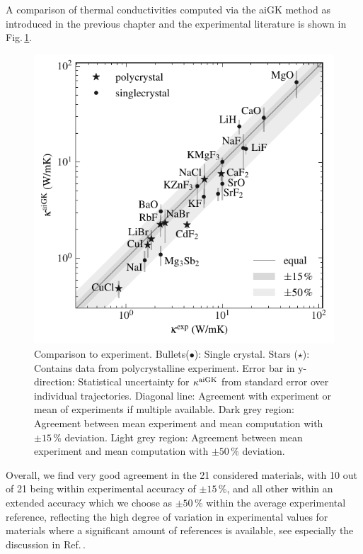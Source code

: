 A comparison of thermal conductivities computed via the aiGK method as introduced in the previous chapter and the experimental literature is shown in Fig.\,\ref{fig:kappa_exp}.
%
\begin{figure}
	\includegraphics[width=\textwidth]{./data/plots/kappa_vs_exp_trusted/kappa_vs_exp_corrected_annotated.pdf}
	\caption{Comparison to experiment. Bullets($\bullet$): Single crystal. Stars ($\star$): Contains data from polycrystalline experiment. Error bar in y-direction: Statistical uncertainty for $\kappa^{\rm aiGK}$ from standard error over individual trajectories. Diagonal line: Agreement with experiment or mean of experiments if multiple available. Dark grey region: Agreement between mean experiment and mean computation with $\pm 15\,\%$ deviation. Light grey region: Agreement between mean experiment and mean computation with $\pm 50\,\%$ deviation.}
	\label{fig:kappa_exp}
\end{figure}
%
Overall, we find very good agreement in the 21 considered materials, with 10 out of 21 being within experimental accuracy of $\pm 15\,\%$, and all other within an extended %
accuracy which we choose as $\pm 50\,\%$ within the average experimental reference, reflecting the high degree of variation in experimental values for materials where a significant amount of references is available, see especially the discussion in Ref.\,\cite{wei2016}. 


